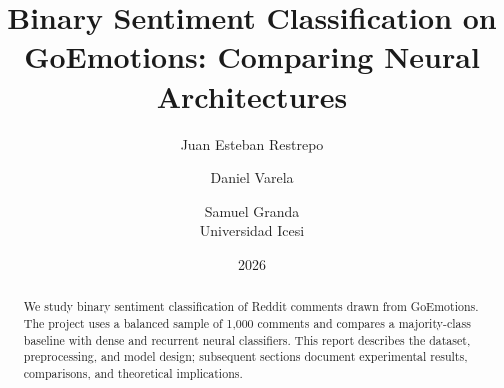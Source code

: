 \documentclass[10pt,twocolumn]{article}
\title{Binary Sentiment Classification on GoEmotions: Comparing Neural Architectures}
\author{Juan Esteban Restrepo \and Daniel Varela \and Samuel Granda\\Universidad Icesi}
\date{2026}
\begin{document}
\maketitle
\begin{abstract}
We study binary sentiment classification of Reddit comments drawn from GoEmotions. The project uses a balanced sample of 1,000 comments and compares a majority-class baseline with dense and recurrent neural classifiers. This report describes the dataset, preprocessing, and model design; subsequent sections document experimental results, comparisons, and theoretical implications.
\end{abstract}









\end{document}
